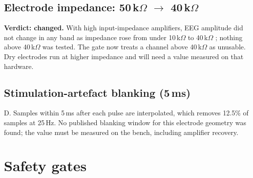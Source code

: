 \documentclass[10pt,a4paper]{article}
\newcommand{\becomes}{\texorpdfstring{$\rightarrow$}{to}}
\newcommand{\lvl}[1]{\textsf{\small #1}}
\begin{document}
\subsection{Electrode impedance: \texorpdfstring{50\,k$\Omega$ \becomes{} 40\,k$\Omega$}{50 kOhm to 40 kOhm}}
\textbf{Verdict: changed.} With high input-impedance amplifiers, EEG amplitude did not change in any band as impedance
rose from under 10\,k$\Omega$ to 40\,k$\Omega$ \parencite{ferree2001}; nothing above 40\,k$\Omega$ was tested. The gate
now treats a channel above 40\,k$\Omega$ as unusable. Dry electrodes run at higher impedance and will need a value
measured on that hardware.

\subsection{Stimulation-artefact blanking (5\,ms)}
\lvl{D}. Samples within 5\,ms after each pulse are interpolated, which removes 12.5\% of samples at 25\,Hz. No published
blanking window for this electrode geometry was found; the value must be measured on the bench, including amplifier
recovery.

\section{Safety gates}\label{sec:gates}
\end{document}
